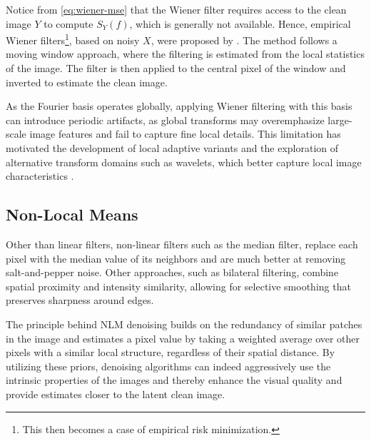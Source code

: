 Notice from \cref{eq:wiener-mse} that the Wiener filter requires access to the clean image $Y$ to compute $S_Y(f)$, which is generally not available. Hence, empirical Wiener filters\footnote{This then becomes a case of empirical risk minimization.}, based on noisy $X$, were proposed by \citeauthor{yaroslavskyDigitalPictureProcessing1985} \cite{yaroslavskyDigitalPictureProcessing1985}. The method follows a moving window approach, where the filtering is estimated from the local statistics of the image. The filter is then applied to the central pixel of the window and inverted to estimate the clean image.

As the Fourier basis operates globally, applying Wiener filtering with this basis can introduce periodic artifacts, as global transforms may overemphasize large-scale image features and fail to capture fine local details. This limitation has motivated the development of local adaptive variants and the exploration of alternative transform domains such as wavelets, which better capture local image characteristics \cite{buadesReviewImageDenoising2005}.

\subsection{Non-Local Means}

Other than linear filters, non-linear filters such as the median filter, replace each pixel with the median value of its neighbors and are much better at removing salt-and-pepper noise. Other approaches, such as bilateral filtering, combine spatial proximity and intensity similarity, allowing for selective smoothing that  preserves sharpness around edges. 

The principle behind \gls{NLM} denoising builds on the redundancy of similar patches in the image and estimates a pixel value by taking a weighted average over other pixels with a similar local structure, regardless of their spatial distance. By utilizing these priors, denoising algorithms can indeed aggressively use the intrinsic properties of the images and thereby enhance the visual quality and provide estimates closer to the latent clean image.

